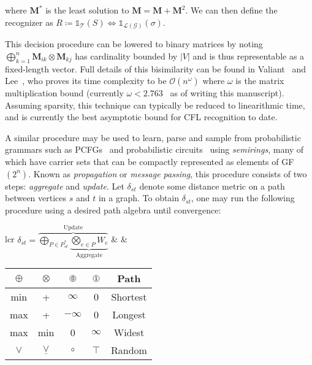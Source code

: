 \documentclass[sigplan,10pt,review,anonymous]{acmart}
\begin{document}
\noindent where $\mathbf{M}^*$ is the least solution to $\mathbf{M} = \mathbf{M} + \mathbf{M}^2$. We can then define the recognizer as $R \coloneqq \mathds{1}_{\mathcal{T}}(S) \iff \mathds{1}_{\mathcal{L}(\mathcal{G})}(\sigma)$.

This decision procedure can be lowered to binary matrices by noting $\bigoplus_{k = 1}^n \mathbf{M}_{ik} \otimes \mathbf{M}_{kj}$ has cardinality bounded by $|V|$ and is thus representable as a fixed-length vector. Full details of this bisimilarity can be found in Valiant~\citep{valiant1975general} and Lee~\citep{lee2002fast}, who proves its time complexity to be $\mathcal{O}(n^\omega)$ where $\omega$ is the matrix multiplication bound (currently $\omega < 2.763$~\citep{harris2021improved} as of writing this manuscript). Assuming sparsity, this technique can typically be reduced to linearithmic time, and is currently the best asymptotic bound for CFL recognition to date.

\noindent A similar procedure may be used to learn, parse and sample from probabilistic grammars such as PCFGs~\citep{goodman1999semiring} and probabilistic circuits~\citep{peharz2015foundations} using \textit{semirings}, many of which have carrier sets that can be compactly represented as elements of GF$(2^n)$. Known as \textit{propagation} or \textit{message passing}, this procedure consists of two steps: \textit{aggregate} and \textit{update}. Let $\delta_{st}$ denote some distance metric on a path between vertices $s$ and $t$ in a graph. To obtain $\delta_{st}$, one may run the following procedure using a desired path algebra until convergence:\\

\vspace{-7}
  \hspace{-12}\begin{tabular}{lcr}
    $\delta_{st} = \overbrace{\underset{P\in P_{st}^*}{\bigoplus}\underbrace{\underset{e\in P}{\bigotimes}W_{e}}_{\text{Aggregate}}}^{\text{Update}}$ & &
    \bgroup
    \def\arraystretch{1.2}
    \begin{tabular}{c{1cm}c{1cm}|c{1cm}c{1cm}|c}
      $\oplus$ & $\otimes$ & $\circled{0}$ & $\circled{1}$ & Path     \\\hline
      min      & +         &   $\infty$    &      0        & Shortest \\
      max      & +         &   $-\infty$   &      0        & Longest  \\
      max      & min       &       0       &   $\infty$    & Widest   \\
      $\vee$   & $\underline{\vee}$ &  $\circ$   &  $\top$  & Random \\
    \end{tabular}
    \egroup
  \end{tabular}\\
\end{document}

